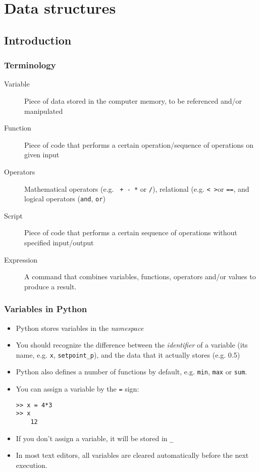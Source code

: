 \section{Data structures}
\subsection*{Introduction}
\begin{frame}
 \frametitle{Terminology}
 \begin{description}
  \item[Variable] Piece of data stored in the computer memory, to be referenced and/or manipulated
  \item[Function] Piece of code that performs a certain operation/sequence of operations on given input
  \item[Operators] Mathematical operators (e.g. \lstinline$ + - *$ or \lstinline$/$), relational (e.g. \lstinline$< >$or \lstinline$==$, and logical operators (\lstinline$and$, \lstinline$or$)
  \item[Script] Piece of code that performs a certain sequence of operations without specified input/output
  \item[Expression] A command that combines variables, functions, operators and/or values to produce a result.
 \end{description}
\end{frame}

\begin{frame}[fragile]
 \frametitle{Variables in Python}
  \begin{itemize}
   \item Python stores variables in the \emph{namespace}\pause
   \item You should recognize the difference between the \emph{identifier} of a variable (its name, e.g. \lstinline$x$, \lstinline$setpoint_p$), and the data that it actually stores (e.g. 0.5)\pause
   \item Python also defines a number of functions by default, e.g. \lstinline$min$, \lstinline$max$ or \lstinline$sum$.\pause
   \item You can assign a variable by the \lstinline$=$ sign:
   \begin{lstlisting}
>> x = 4*3
>> x
    12
   \end{lstlisting}\pause
   \item If you don't assign a variable, it will be stored in \lstinline$_$
   \item In most text editors, all variables are cleared automatically before the next execution. 
 \end{itemize}
\end{frame}


